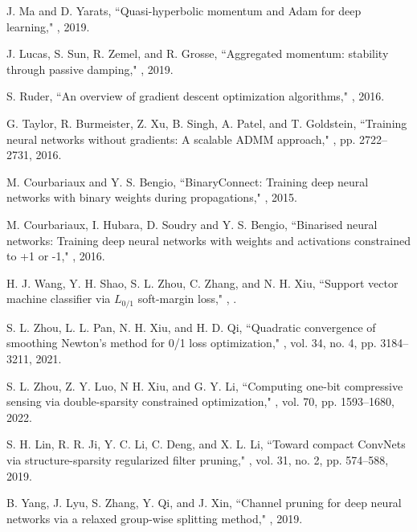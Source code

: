 \documentclass[journal]{IEEEtran}
\begin{document}
\begin{thebibliography}{99}
 J. Ma and D. Yarats,
  \newblock  ``Quasi-hyperbolic momentum and Adam for deep learning,"
 , 2019.


J. Lucas,  S. Sun,   R. Zemel, and R. Grosse,
 \newblock  ``Aggregated momentum: stability through passive damping,"
, 2019.


S. Ruder,
\newblock  ``An overview of gradient descent optimization algorithms,"
, 2016.


G. Taylor, R. Burmeister, Z. Xu, B. Singh, A. Patel, and T. Goldstein,
\newblock  ``Training neural networks without gradients: A scalable ADMM approach,"
,
 pp. 2722--2731, 2016.


M. Courbariaux and Y. S. Bengio,
\newblock  ``BinaryConnect: Training deep neural networks with binary weights during propagations,"
, 2015.


M. Courbariaux, I. Hubara, D. Soudry and Y. S. Bengio,
\newblock  ``Binarised neural networks: Training deep neural networks with weights and activations
constrained to +1 or -1,"
, 2016.





H. J. Wang, Y. H. Shao, S. L. Zhou, C. Zhang, and N. H. Xiu,
\newblock  ``Support vector machine classifier via $L_{0/1}$ soft-margin loss,"
,
.


S. L. Zhou, L. L. Pan, N. H. Xiu, and H. D. Qi,
\newblock  ``Quadratic convergence of smoothing Newton's method for 0/1 loss optimization,"
,
\newblock vol. 34, no. 4, pp. 3184--3211, 2021.


S. L. Zhou, Z. Y. Luo, N H. Xiu, and G. Y. Li,
\newblock  ``Computing one-bit compressive sensing via double-sparsity constrained optimization,"
,
\newblock vol. 70, pp. 1593--1680, 2022.


S. H. Lin, R. R. Ji, Y. C. Li, C. Deng, and X. L. Li,
\newblock  ``Toward compact ConvNets via structure-sparsity regularized filter pruning,"
,
\newblock vol. 31, no. 2, pp. 574--588, 2019.


B. Yang, J. Lyu, S. Zhang, Y. Qi, and J. Xin,
\newblock  ``Channel pruning for deep neural networks via a relaxed group-wise splitting method,"
, 2019.



\end{thebibliography}
\end{document}
